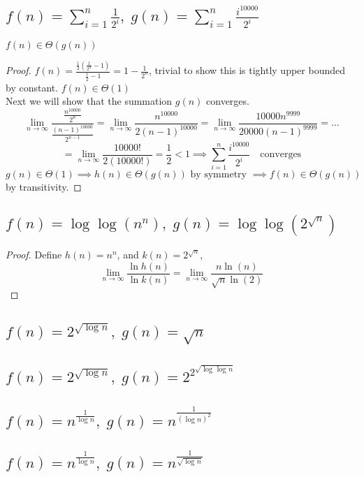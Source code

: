 \documentclass{article}
\begin{document}
\subsection{$f(n) = \sum_{i=1}^n \frac{1}{2^i},\; g(n) = \sum_{i=1}^n \frac{i^{10000}}{2^i}$}
$f(n) \in \Theta(g(n))$
\begin{proof}
   $f(n) = \frac{\frac{1}{2}(\frac{1}{2^n} -1)}{\frac{1}{2} - 1} = 1 - \frac{1}{2^n}$, 
   trivial to show this is tightly upper bounded by constant. $f(n) \in \Theta(1)$\\
   Next we will show that the summation $g(n)$ converges. \\
   \[\lim_{n \rightarrow \infty} \frac{\frac{n^{10000}}{2^n}}{\frac{(n-1)^{10000}}{2^{n-1}}} 
   = \lim_{n \rightarrow \infty} \frac{n^{10000}}{2(n-1)^{10000}} = \lim_{n \rightarrow \infty} \frac{10000 n^{9999}}{20000(n-1)^{9999}} = \dots\]
   \[= \lim_{n \rightarrow \infty} \frac{10000!}{2(10000!)} = \frac{1}{2} < 1 \implies \sum_{i=1}^n \frac{i^{10000}}{2^i} \quad \text{converges}\]
   $g(n) \in \Theta(1) \implies h(n) \in \Theta(g(n)) \text{ by symmetry }\implies f(n) \in \Theta(g(n))$ by transitivity.
\end{proof}

\subsection{$f(n) = \log\log (n^n),\; g(n) = \log\log(2^{\sqrt{n}})$}
\begin{proof}
    Define $h(n) = n^n$, and $k(n)=2^{\sqrt{n}}$,
    \[\lim_{n \rightarrow \infty} \frac{\ln h(n)}{\ln k(n)} = \lim_{n \rightarrow \infty} \frac{n\ln(n)}{{\sqrt{n}\ln(2)}}\]
\end{proof}
\subsection{$f(n) = 2^{\sqrt{\log n}},\; g(n) = \sqrt{n}$}

\subsection{$f(n) = 2^{\sqrt{\log n}},\; g(n) = 2^{2^{\sqrt{\log\log n}}}$}

\subsection{$f(n) = n^{\frac{1}{\log n}},\; g(n) = n^{\frac{1}{(\log n)^2}}$}

\subsection{$f(n) = n^{\frac{1}{\log n}},\; g(n) = n^{\frac{1}{\sqrt{\log n}}}$}
\end{document}
